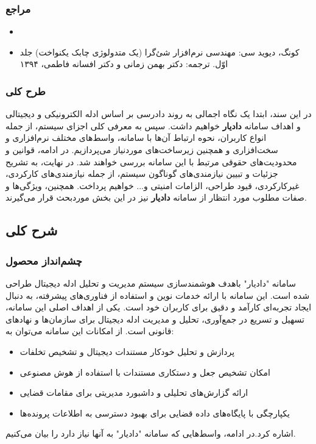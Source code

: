 \documentclass[12pt,a4paper,oneside]{article}
\begin{document}
			\subsubsection{مراجع}

			\begin{itemize}
				\item 
				
				\item 
				کونگ، دیوید سی: مهندسی نرم‌افزار شئ‌گرا (یک متدولوژی چابک یکنواخت) جلد اوّل. ترجمه: دکتر بهمن زمانی و دکتر افسانه فاطمی، ۱۳۹۴
			
			\end{itemize}

			\subsubsection{طرح کلی}
			در این سند، ابتدا یک نگاه اجمالی به روند دادرسی بر اساس ادله الکترونیکی و دیجیتالی و اهداف سامانه \textbf{دادیار} خواهیم داشت. سپس به معرفی کلی اجزای سیستم، از جمله انواع کاربران، نحوه ارتباط آن‌ها با سامانه، واسط‌های مختلف نرم‌افزاری و سخت‌افزاری و همچنین زیرساخت‌های موردنیاز می‌پردازیم. در ادامه، قوانین و محدودیت‌های حقوقی مرتبط با این سامانه بررسی خواهند شد. در نهایت، به تشریح جزئیات و تبیین نیازمندی‌های گوناگون سیستم، از جمله نیازمندی‌های کارکردی، غیرکارکردی، قیود طراحی، الزامات امنیتی و... خواهیم پرداخت. همچنین، ویژگی‌ها و صفات مطلوب مورد انتظار از سامانه \textbf{دادیار} نیز در این بخش موردبحث قرار می‌گیرند.

	\subsection{شرح کلی}

	\subsubsection{چشم‌انداز محصول}

سامانه "دادیار" باهدف هوشمندسازی سیستم مدیریت و تحلیل ادله دیجیتال طراحی شده است. این سامانه با ارائه خدمات نوین و استفاده از فناوری‌های پیشرفته، به دنبال ایجاد تجربه‌ای کارآمد و دقیق برای کاربران خود است.
یکی از اهداف اصلی این سامانه، تسهیل و تسریع در جمع‌آوری، تحلیل و مدیریت ادله دیجیتال برای سازمان‌ها و نهادهای قانونی است. از امکانات این سامانه می‌توان به:

\begin{itemize}
\item پردازش و تحلیل خودکار مستندات دیجیتال و تشخیص تخلفات
\item امکان تشخیص جعل و دستکاری مستندات با استفاده از هوش مصنوعی
\item ارائه گزارش‌های تحلیلی و داشبورد مدیریتی برای مقامات قضایی
\item یکپارچگی با پایگاه‌های داده قضایی برای بهبود دسترسی به اطلاعات پرونده‌ها
\end{itemize}
اشاره کرد.در ادامه، واسط‌هایی که سامانه "دادیار" به آنها نیاز دارد را بیان می‌کنیم.
			
\end{document}

